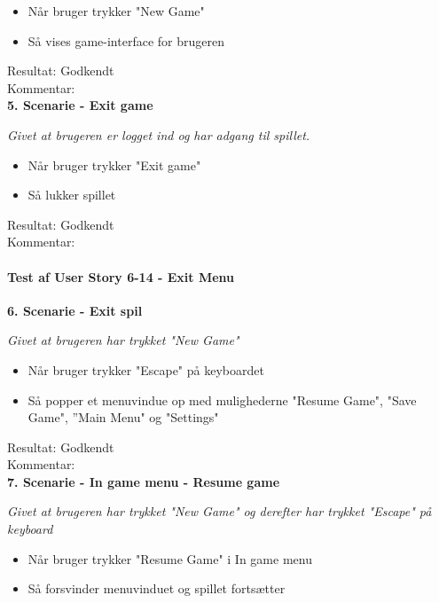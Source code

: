 \begin{itemize}
  \item Når bruger trykker "New Game"
  \item Så vises game-interface for brugeren
\end{itemize}

Resultat: Godkendt\\
Kommentar:\\

\textbf{5. Scenarie - Exit game}

\textit{Givet at brugeren er logget ind og har adgang til spillet.}

\begin{itemize}
  \item Når bruger trykker "Exit game"
  \item Så lukker spillet
\end{itemize}

Resultat: Godkendt\\
Kommentar:\\

\paragraph{Test af User Story 6-14 - Exit Menu}

\textbf{6. Scenarie - Exit spil}

\textit{Givet at brugeren har trykket "New Game"}

\begin{itemize}
  \item Når bruger trykker "Escape" på keyboardet
  \item Så popper et menuvindue op med mulighederne "Resume Game", "Save Game", ”Main Menu" og "Settings"
\end{itemize}

Resultat: Godkendt\\
Kommentar:\\

\textbf{7. Scenarie - In game menu - Resume game}

\textit{Givet at brugeren har trykket "New Game" og derefter har trykket "Escape" på keyboard}

\begin{itemize}
  \item Når bruger trykker "Resume Game" i In game menu
  \item Så forsvinder menuvinduet og spillet fortsætter
\end{itemize}

